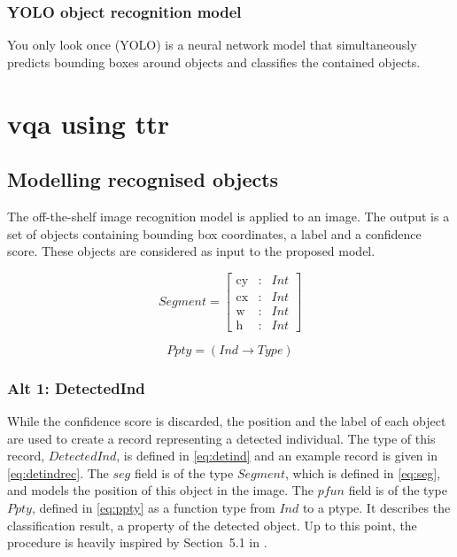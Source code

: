 \documentclass[11pt, a4paper]{article}
\begin{document}
\subsubsection{YOLO object recognition model}

You only look once (YOLO) \citep{RedmonYouOnlyLook2015} is a neural network model that simultaneously predicts bounding boxes around objects and classifies the contained objects.

\section{\Gls{vqa} using \gls{ttr}}

\subsection{Modelling recognised objects}

The off-the-shelf image recognition model is applied to an image.
The output is a set of objects containing bounding box coordinates, a label and a confidence score.
These objects are considered as input to the proposed model.

\begin{equation}\label{eq:seg}
Segment = \left[\begin{array}{rcl}
\text{cy} &:& Int\\
\text{cx} &:& Int\\
\text{w} &:& Int\\
\text{h} &:& Int
\end{array}\right]\end{equation}

\begin{equation}\label{eq:ppty}
Ppty = (Ind\rightarrow Type)\end{equation}

\subsubsection{Alt 1: DetectedInd}

While the confidence score is discarded, the position and the label of each object are used to create a record representing a detected individual.
The type of this record, $DetectedInd$, is defined in \autoref{eq:detind} and an example record is given in \autoref{eq:detindrec}.
The $seg$ field is of the type $Segment$, which is defined in \autoref{eq:seg}, and models the position of this object in the image.
The $pfun$ field is of the type $Ppty$, defined in \autoref{eq:ppty} as a function type from $Ind$ to a ptype.
It describes the classification result, a property of the detected object.
Up to this point, the procedure is heavily inspired by Section~5.1 in \cite{DobnikInterfacinglanguagespatial2017}.
\end{document}
